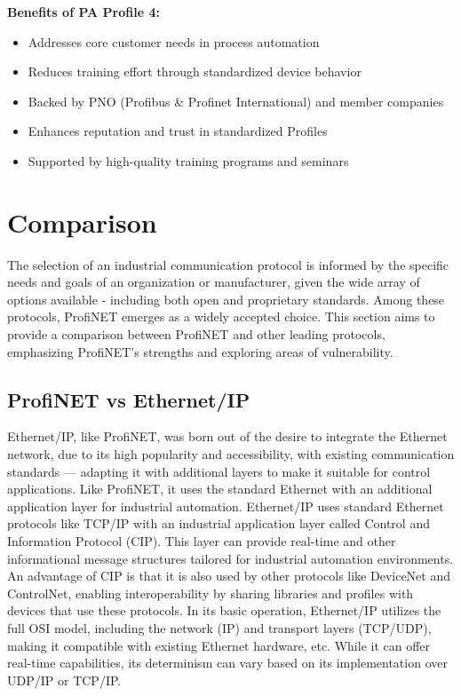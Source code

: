 \documentclass[conference]{IEEEtran}
\begin{document}
\textbf{Benefits of PA Profile 4:}
\begin{itemize}
    \item Addresses core customer needs in process automation
    \item Reduces training effort through standardized device behavior
    \item Backed by PNO (Profibus \& Profinet International) and member companies
    \item Enhances reputation and trust in standardized Profiles
    \item Supported by high-quality training programs and seminars
\end{itemize}


\section{Comparison}
The selection of an industrial communication protocol is informed by the specific needs and goals of an organization or manufacturer, given the wide array of options available - including both open and proprietary standards. Among these protocols, ProfiNET emerges as a widely accepted choice. This section aims to provide a comparison between ProfiNET and other leading protocols, emphasizing ProfiNET's strengths and exploring areas of vulnerability. 

\subsection{ProfiNET vs Ethernet/IP}
Ethernet/IP, like ProfiNET, was born out of the desire to integrate the Ethernet network, due to its high popularity and accessibility, with existing communication standards — adapting it with additional layers to make it suitable for control applications. Like ProfiNET, it uses the standard Ethernet with an additional application layer for industrial automation. Ethernet/IP uses standard Ethernet protocols like TCP/IP with an industrial application layer called Control and Information Protocol (CIP). This layer can provide real-time and other informational message structures tailored for industrial automation environments. An advantage of CIP is that it is also used by other protocols like DeviceNet and ControlNet, enabling interoperability by sharing libraries and profiles with devices that use these protocols\cite{Acromag2020EthernetIP}. In its basic operation, Ethernet/IP utilizes the full OSI model, including the network (IP) and transport layers (TCP/UDP), making it compatible with existing Ethernet hardware, etc. While it can offer real-time capabilities, its determinism can vary based on its implementation over UDP/IP or TCP/IP.
\end{document}
